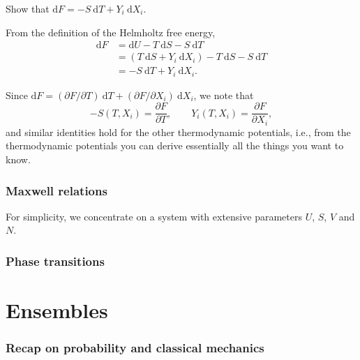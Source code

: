 \documentclass[letter-paper]{tufte-book}
\newenvironment{example}[1][Example]{\begin{trivlist}
\item[\hskip \labelsep {\bfseries #1}]}{\end{trivlist}}
\begin{document}
\begin{example}
Show that $\mathrm{d}F = -S\ \mathrm{d}T + Y_i\ \mathrm{d}X_i$.

From the definition of the Helmholtz free energy,
\begin{align*}
  \mathrm{d}F &= \mathrm{d}U - T\ \mathrm{d}S - S\ \mathrm{d}T\\
    &= (T\ \mathrm{d}S + Y_i\ \mathrm{d}X_i) - T\ \mathrm{d}S - S\ \mathrm{d}T\\
    &= -S\ \mathrm{d}T + Y_i\ \mathrm{d}X_i.
\end{align*}

Since $\mathrm{d}F = (\partial F / \partial T)\ \mathrm{d}T + (\partial F /
\partial X_i)\ \mathrm{d}X_i$, we note that
\begin{equation}
  -S(T, X_i) = \frac{\partial F}{\partial T}, \qquad Y_i(T, X_i) = \frac{\partial F}{\partial X_i},
\end{equation}
and similar identities hold for the other thermodynamic potentials, i.e., from
the thermodynamic potentials you can derive essentially all the things you want
to know.
\end{example}


\subsection{Maxwell relations}

For simplicity, we concentrate on a system with extensive parameters $U$, $S$,
$V$ and $N$.


\subsection{Phase transitions}


\chapter{Ensembles}


\subsection{Recap on probability and classical mechanics}
\end{document}
